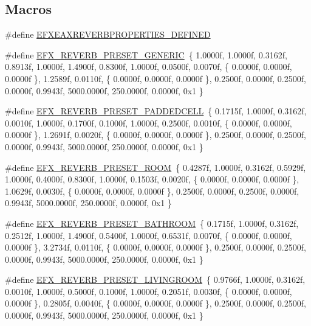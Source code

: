 \subsection*{Macros}
\begin{DoxyCompactItemize}
\item 
\#define \hyperlink{efx-presets_8h_ace330587ef80ff1a1c4590be4a35fe86}{E\+F\+X\+E\+A\+X\+R\+E\+V\+E\+R\+B\+P\+R\+O\+P\+E\+R\+T\+I\+E\+S\+\_\+\+D\+E\+F\+I\+N\+ED}
\item 
\#define \hyperlink{efx-presets_8h_a30c63b1f0ea6c1dab451ead2cce9574d}{E\+F\+X\+\_\+\+R\+E\+V\+E\+R\+B\+\_\+\+P\+R\+E\+S\+E\+T\+\_\+\+G\+E\+N\+E\+R\+IC}~\{ 1.\+0000f, 1.\+0000f, 0.\+3162f, 0.\+8913f, 1.\+0000f, 1.\+4900f, 0.\+8300f, 1.\+0000f, 0.\+0500f, 0.\+0070f, \{ 0.\+0000f, 0.\+0000f, 0.\+0000f \}, 1.\+2589f, 0.\+0110f, \{ 0.\+0000f, 0.\+0000f, 0.\+0000f \}, 0.\+2500f, 0.\+0000f, 0.\+2500f, 0.\+0000f, 0.\+9943f, 5000.\+0000f, 250.\+0000f, 0.\+0000f, 0x1 \}
\item 
\#define \hyperlink{efx-presets_8h_a74f770d92d0a66fe01e1cb2691db14b5}{E\+F\+X\+\_\+\+R\+E\+V\+E\+R\+B\+\_\+\+P\+R\+E\+S\+E\+T\+\_\+\+P\+A\+D\+D\+E\+D\+C\+E\+LL}~\{ 0.\+1715f, 1.\+0000f, 0.\+3162f, 0.\+0010f, 1.\+0000f, 0.\+1700f, 0.\+1000f, 1.\+0000f, 0.\+2500f, 0.\+0010f, \{ 0.\+0000f, 0.\+0000f, 0.\+0000f \}, 1.\+2691f, 0.\+0020f, \{ 0.\+0000f, 0.\+0000f, 0.\+0000f \}, 0.\+2500f, 0.\+0000f, 0.\+2500f, 0.\+0000f, 0.\+9943f, 5000.\+0000f, 250.\+0000f, 0.\+0000f, 0x1 \}
\item 
\#define \hyperlink{efx-presets_8h_ade1399e441c36d69b5ae54171f3fc4c5}{E\+F\+X\+\_\+\+R\+E\+V\+E\+R\+B\+\_\+\+P\+R\+E\+S\+E\+T\+\_\+\+R\+O\+OM}~\{ 0.\+4287f, 1.\+0000f, 0.\+3162f, 0.\+5929f, 1.\+0000f, 0.\+4000f, 0.\+8300f, 1.\+0000f, 0.\+1503f, 0.\+0020f, \{ 0.\+0000f, 0.\+0000f, 0.\+0000f \}, 1.\+0629f, 0.\+0030f, \{ 0.\+0000f, 0.\+0000f, 0.\+0000f \}, 0.\+2500f, 0.\+0000f, 0.\+2500f, 0.\+0000f, 0.\+9943f, 5000.\+0000f, 250.\+0000f, 0.\+0000f, 0x1 \}
\item 
\#define \hyperlink{efx-presets_8h_a9a6ed45db903abdc2855254f72c89897}{E\+F\+X\+\_\+\+R\+E\+V\+E\+R\+B\+\_\+\+P\+R\+E\+S\+E\+T\+\_\+\+B\+A\+T\+H\+R\+O\+OM}~\{ 0.\+1715f, 1.\+0000f, 0.\+3162f, 0.\+2512f, 1.\+0000f, 1.\+4900f, 0.\+5400f, 1.\+0000f, 0.\+6531f, 0.\+0070f, \{ 0.\+0000f, 0.\+0000f, 0.\+0000f \}, 3.\+2734f, 0.\+0110f, \{ 0.\+0000f, 0.\+0000f, 0.\+0000f \}, 0.\+2500f, 0.\+0000f, 0.\+2500f, 0.\+0000f, 0.\+9943f, 5000.\+0000f, 250.\+0000f, 0.\+0000f, 0x1 \}
\item 
\#define \hyperlink{efx-presets_8h_a5875bf429c4a85ca8038e9977bc1eca2}{E\+F\+X\+\_\+\+R\+E\+V\+E\+R\+B\+\_\+\+P\+R\+E\+S\+E\+T\+\_\+\+L\+I\+V\+I\+N\+G\+R\+O\+OM}~\{ 0.\+9766f, 1.\+0000f, 0.\+3162f, 0.\+0010f, 1.\+0000f, 0.\+5000f, 0.\+1000f, 1.\+0000f, 0.\+2051f, 0.\+0030f, \{ 0.\+0000f, 0.\+0000f, 0.\+0000f \}, 0.\+2805f, 0.\+0040f, \{ 0.\+0000f, 0.\+0000f, 0.\+0000f \}, 0.\+2500f, 0.\+0000f, 0.\+2500f, 0.\+0000f, 0.\+9943f, 5000.\+0000f, 250.\+0000f, 0.\+0000f, 0x1 \}

\end{DoxyCompactItemize}
